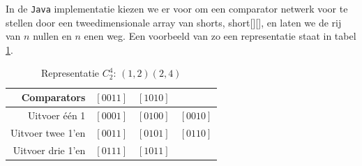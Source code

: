 \documentclass{article}
\begin{document}
In de \texttt{Java} implementatie kiezen we er voor om een comparator netwerk voor te stellen door een tweedimensionale array van shorts, short[][], en laten we de rij van $n$ nullen en $n$ enen  weg.
Een voorbeeld van zo een representatie staat in tabel \ref{tabel2}.
\begin{table}[!h]
	\centering
	\begin{tabular}{r|ccc}
	Comparators & $\left[0011\right]$ & $\left[1010\right]$ & \\ 
	\hline 
	Uitvoer \'e\'en 1& $\left[0001\right]$ & $\left[0100\right]$ & $\left[0010\right]$ \\ 
	\hline 
	Uitvoer twee 1'en &$\left[0011\right]$ & $\left[0101\right]$ & $\left[0110\right]$\\ 
	\hline 
	Uitvoer drie 1'en & $\left[0111\right]$ & $\left[1011\right]$ &  \\ 
	\end{tabular}
	\caption{Representatie $C^4_2$: $(1,2)(2,4)$}
	\label{tabel2}
\end{table}
\end{document}
